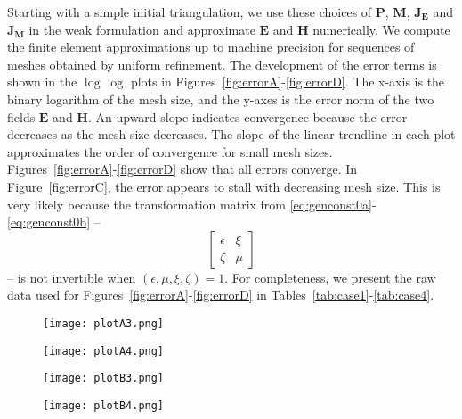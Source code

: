 \documentclass[journal,transmag]{IEEEtran}
\newcommand*\VF[1]{\mathbf{#1}}
\begin{document}
Starting with a simple initial triangulation, we use these choices of $\VF{P}$, $\VF{M}$, $\VF{J_E}$ and $\VF{J_M}$ in the weak formulation and approximate $\VF{E}$ and $\VF{H}$ numerically. 
We compute the finite element approximations up to machine precision for sequences of meshes obtained by uniform refinement. 
The development of the error terms is shown in the $\log\log$ plots in Figures~\ref{fig:errorA}-\ref{fig:errorD}.
The x-axis is the binary logarithm of the mesh size, and the y-axes is the error norm of the two fields $\VF{E}$ and $\VF{H}$.
An upward-slope indicates convergence because the error decreases as the mesh size decreases.
The slope of the linear trendline in each plot approximates the order of convergence for small mesh sizes. 
\\

Figures~\ref{fig:errorA}-\ref{fig:errorD} show that all errors converge. 
In Figure~\ref{fig:errorC}, the error appears to stall
with decreasing mesh size. This is very likely because the 
transformation matrix from \eqref{eq:genconst0a}-\eqref{eq:genconst0b} --
$$
\begin{bmatrix}
\epsilon & \xi \\
\zeta & \mu 
\end{bmatrix}
$$
-- is not invertible when $(\epsilon,\mu,\xi,\zeta) = 1$.
For completeness, we present the raw data used for 
Figures~\ref{fig:errorA}-\ref{fig:errorD} in 
Tables~\ref{tab:case1}-\ref{tab:case4}.


\begin{figure*} 
    \begin{subfigure}{.5\textwidth}
    \centering
    \texttt{[image: plotA3.png]}
    \label{fig:errorA:3}
    \end{subfigure}
    \begin{subfigure}{.5\textwidth}
    \centering
    \texttt{[image: plotA4.png]}\label{fig:errorA:4}
    \end{subfigure}
    \caption{Behavior of the $L^2$ error
    of numerically computed electric field $\VF{E}$ and magnetic field $\VF{H}$ with decreasing mesh size
    for our standard example.
    Here, we have used $(\epsilon,\mu) = 1$ and $(\xi,\zeta) = 0$.}
    \label{fig:errorA}
\end{figure*}




\begin{figure*} 
    \begin{subfigure}{.5\textwidth}
        \centering
        \texttt{[image: plotB3.png]}
        \label{fig:errorB:3}
    \end{subfigure}
    \begin{subfigure}{.5\textwidth}
        \centering
        \texttt{[image: plotB4.png]}\label{fig:errorB:4}
    \end{subfigure}
    \caption{Behavior of the $L^2$ error
    of numerically computed electric field $\VF{E}$ and magnetic field $\VF{H}$ with decreasing mesh size
    for our standard example.
    Here, we have used $(\epsilon,\mu) = 0$ and $(\xi,\zeta) = 1$.}
    \label{fig:errorB}
\end{figure*}
\end{document}

